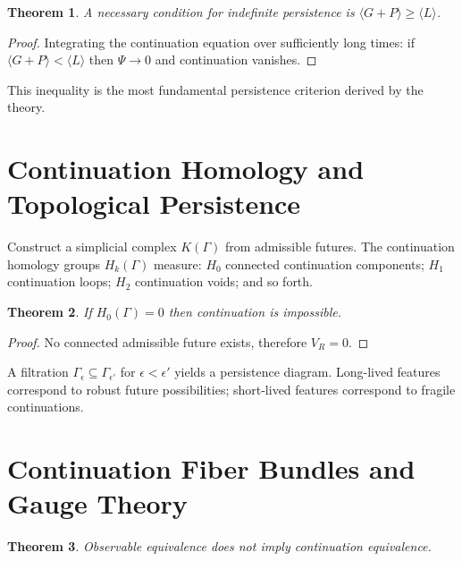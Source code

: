 \documentclass[12pt,a4paper]{article}
\newtheorem{theorem}{Theorem}[section]
\begin{document}
\begin{theorem}
A necessary condition for indefinite persistence is $\langle G + P \rangle \ge \langle L \rangle$.
\end{theorem}

\begin{proof}
Integrating the continuation equation over sufficiently long times: if $\langle G + P \rangle < \langle L \rangle$ then $\Psi \to 0$ and continuation vanishes.
\end{proof}

This inequality is the most fundamental persistence criterion derived by the theory.

\section{Continuation Homology and Topological Persistence}

Construct a simplicial complex $K(\Gamma)$ from admissible futures. The continuation homology groups $H_k(\Gamma)$ measure: $H_0$ connected continuation components; $H_1$ continuation loops; $H_2$ continuation voids; and so forth.

\begin{theorem}
If $H_0(\Gamma) = 0$ then continuation is impossible.
\end{theorem}

\begin{proof}
No connected admissible future exists, therefore $V_R = 0$.
\end{proof}

A filtration $\Gamma_\epsilon \subseteq \Gamma_{\epsilon'}$ for $\epsilon < \epsilon'$ yields a persistence diagram. Long-lived features correspond to robust future possibilities; short-lived features correspond to fragile continuations.

\section{Continuation Fiber Bundles and Gauge Theory}

\begin{theorem}
Observable equivalence does not imply continuation equivalence.
\end{theorem}
\end{document}

